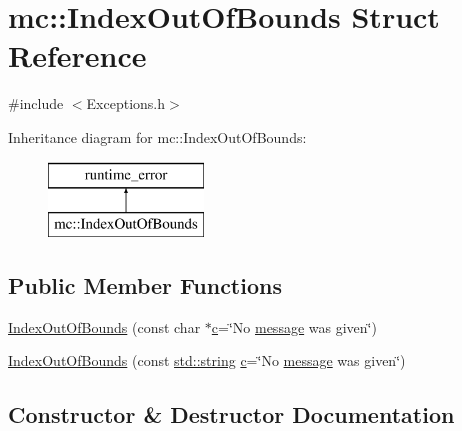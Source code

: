 \hypertarget{structmc_1_1_index_out_of_bounds}{}\section{mc\+:\+:Index\+Out\+Of\+Bounds Struct Reference}
\label{structmc_1_1_index_out_of_bounds}


{\ttfamily \#include $<$Exceptions.\+h$>$}

Inheritance diagram for mc\+:\+:Index\+Out\+Of\+Bounds\+:\begin{figure}[H]
\begin{center}
\leavevmode
\includegraphics[height=2.000000cm]{structmc_1_1_index_out_of_bounds}
\end{center}
\end{figure}
\subsection*{Public Member Functions}
\begin{DoxyCompactItemize}
\item 
\hyperlink{structmc_1_1_index_out_of_bounds_aa4f02ccacfffa4f3470b4b4c7faf7ebd}{Index\+Out\+Of\+Bounds} (const char $\ast$\hyperlink{_s_d_l__opengl__glext_8h_a1f2d7f8147412c43ba2303a56f97ee73}{c}=\char`\"{}No \hyperlink{_s_d_l__opengl__glext_8h_a7b6161cffb9b8aee272b3b916183d28c}{message} was given\char`\"{})
\item 
\hyperlink{structmc_1_1_index_out_of_bounds_a52360d4332f55b0757bcf25668970eff}{Index\+Out\+Of\+Bounds} (const \hyperlink{_s_d_l__opengl__glext_8h_ae84541b4f3d8e1ea24ec0f466a8c568b}{std\+::string} \hyperlink{_s_d_l__opengl__glext_8h_a1f2d7f8147412c43ba2303a56f97ee73}{c}=\char`\"{}No \hyperlink{_s_d_l__opengl__glext_8h_a7b6161cffb9b8aee272b3b916183d28c}{message} was given\char`\"{})
\end{DoxyCompactItemize}


\subsection{Constructor \& Destructor Documentation}
